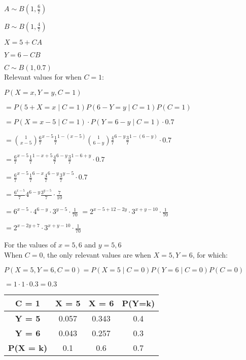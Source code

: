 \documentclass[12pt]{article}
\begin{document}
$ A \sim B(1, \frac{6}{7}) $

$ B \sim B(1, \frac{4}{7}) $

$ X = 5 + CA $

$ Y = 6 - CB $

$ C \sim B(1, 0.7) $ \\
 
Relevant values for when $ C = 1 $:


$ P(X=x,Y=y,C=1) $

$ = P(5 + X = x \mid C = 1)P(6 - Y = y \mid C = 1)P(C = 1) $

$ = P(X = x - 5 \mid C = 1) \cdot P(Y = 6 - y \mid C = 1) \cdot 0.7 $

$ = \binom{1}{x - 5}\frac{6}{7}^{x-5}\frac{1}{7}^{1-(x-5)} \binom{1}{6 - y}\frac{4}{7}^{6 - y}\frac{3}{7}^{1-(6 - y)} \cdot 0.7 $

$ = \frac{6}{7}^{x-5}\frac{1}{7}^{1-x+5} \frac{4}{7}^{6 - y}\frac{3}{7}^{1 - 6 + y} \cdot 0.7 $

$ = \frac{6}{7}^{x-5}\frac{1}{7}^{6-x} \frac{4}{7}^{6 - y}\frac{3}{7}^{y - 5} \cdot 0.7 $

$ = \frac{6^{x-5}}{7}4^{6 - y}\frac{3^{y - 5}}{7} \cdot \frac{7}{10} $

$ = 6^{x-5} \cdot 4^{6 - y} \cdot 3^{y - 5} \cdot \frac{1}{70} $
$ = 2^{x-5+12-2y} \cdot 3^{x + y - 10} \cdot \frac{1}{70} $

$ = 2^{x-2y+7} \cdot 3^{x + y - 10} \cdot \frac{1}{70} $

For the values of $ x = 5,6 $ and $ y = 5,6 $ \\

When $ C = 0 $, the only relevant values are when $ X = 5, Y = 6 $, for which:

$ P(X = 5, Y = 6, C = 0) = P(X = 5 \mid C = 0)P(Y = 6 \mid C = 0)P(C = 0) $

$ = 1 \cdot 1 \cdot 0.3 = 0.3 $ \\


\begin{center}
\begin{tabular}{|c|c|c|c|}
\hline
\textbf{C = 1}      & \textbf{X = 5} & \textbf{X = 6} & \textbf{P(Y=k)} \\ 
\hline
\textbf{Y = 5}      & 0.057             & 0.343              & 0.4                    \\ 
\hline
\textbf{Y = 6}      & 0.043             & 0.257              & 0.3                    \\ 
\hline
\textbf{P(X = k)} & 0.1                   & 0.6                  & 0.7                    \\ 
\hline
\end{tabular}
\end{center}
\end{document}

